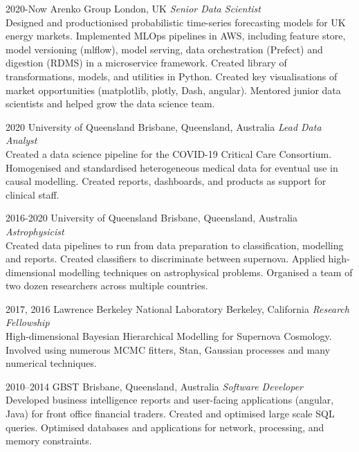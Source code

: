 \documentclass[]{friggeri-cv2}
\begin{document}
\begin{entrylist}

\entry
{2020-Now}
{Arenko Group}
{London, UK}
{\emph{Senior Data Scientist} \\
Designed and productionised probabilistic time-series forecasting models for UK energy markets.
Implemented MLOps pipelines in AWS, including feature store, model versioning (mlflow), model serving, 
data orchestration (Prefect) and digestion (RDMS) in a microservice framework.
Created library of transformations, models, and utilities in Python.
Created key visualisations of market opportunities (matplotlib, plotly, Dash, angular).
Mentored junior data scientists and helped grow the data science team.}

\entry
{2020}
{University of Queensland}
{Brisbane, Queensland, Australia}
{\emph{Lead Data Analyst} \\
Created a data science pipeline for the COVID-19 Critical Care Consortium. 
Homogenised and standardised heterogeneous medical data for eventual use in causal modelling. 
Created reports, dashboards, and products as support for clinical staff.}

\entry
{2016-2020}
{University of Queensland}
{Brisbane, Queensland, Australia}
{\emph{Astrophysicist} \\
Created data pipelines to run from data preparation to classification, modelling and reports. 
Created classifiers to discriminate between supernova. 
Applied high-dimensional modelling techniques on astrophysical problems.
Organised a team of two dozen researchers across multiple countries.}


\entry
{2017, 2016}
{Lawrence Berkeley National Laboratory}
{Berkeley, California}
{\emph{Research Fellowship} \\
High-dimensional Bayesian Hierarchical Modelling for Supernova Cosmology. 
Involved using numerous MCMC fitters, Stan, Gaussian processes and many numerical techniques.}



\entry
{2010--2014}
{GBST}
{Brisbane, Queensland, Australia}
{\emph{Software Developer} \\
Developed business intelligence reports and user-facing applications (angular, Java) for front office financial traders. Created and optimised large scale SQL queries. Optimised databases and applications for network, processing, and memory constraints.}

\end{entrylist}
\end{document}
